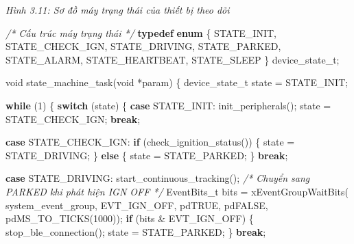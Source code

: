 \documentclass[13pt,a4paper]{extarticle}
\newenvironment{Shaded}{}{}
\newcommand{\CommentTok}[1]{\textcolor[rgb]{0.38,0.63,0.69}{\textit{#1}}}
\newcommand{\ControlFlowTok}[1]{\textcolor[rgb]{0.00,0.44,0.13}{\textbf{#1}}}
\newcommand{\DataTypeTok}[1]{\textcolor[rgb]{0.56,0.13,0.00}{#1}}
\newcommand{\DecValTok}[1]{\textcolor[rgb]{0.25,0.63,0.44}{#1}}
\newcommand{\KeywordTok}[1]{\textcolor[rgb]{0.00,0.44,0.13}{\textbf{#1}}}
\newcommand{\NormalTok}[1]{#1}
\newcommand{\OperatorTok}[1]{\textcolor[rgb]{0.40,0.40,0.40}{#1}}
\renewcommand{\\}{\thesislongtableorignewline\hline}%
\newcommand{\thesisfigurecaption}[1]{%
  \begin{center}\emph{#1}\end{center}%
}
\begin{document}
\thesisfigurecaption{Hình 3.11: Sơ đồ máy trạng thái của thiết bị theo dõi}

\begin{Shaded}
\begin{Highlighting}[]
\CommentTok{/* Cấu trúc máy trạng thái */}
\KeywordTok{typedef} \KeywordTok{enum} \OperatorTok{\{}
\NormalTok{    STATE\_INIT}\OperatorTok{,}
\NormalTok{    STATE\_CHECK\_IGN}\OperatorTok{,}
\NormalTok{    STATE\_DRIVING}\OperatorTok{,}
\NormalTok{    STATE\_PARKED}\OperatorTok{,}
\NormalTok{    STATE\_ALARM}\OperatorTok{,}
\NormalTok{    STATE\_HEARTBEAT}\OperatorTok{,}
\NormalTok{    STATE\_SLEEP}
\OperatorTok{\}}\NormalTok{ device\_state\_t}\OperatorTok{;}

\DataTypeTok{void}\NormalTok{ state\_machine\_task}\OperatorTok{(}\DataTypeTok{void} \OperatorTok{*}\NormalTok{param}\OperatorTok{)} \OperatorTok{\{}
\NormalTok{    device\_state\_t state }\OperatorTok{=}\NormalTok{ STATE\_INIT}\OperatorTok{;}

    \ControlFlowTok{while} \OperatorTok{(}\DecValTok{1}\OperatorTok{)} \OperatorTok{\{}
        \ControlFlowTok{switch} \OperatorTok{(}\NormalTok{state}\OperatorTok{)} \OperatorTok{\{}
        \ControlFlowTok{case}\NormalTok{ STATE\_INIT}\OperatorTok{:}
\NormalTok{            init\_peripherals}\OperatorTok{();}
\NormalTok{            state }\OperatorTok{=}\NormalTok{ STATE\_CHECK\_IGN}\OperatorTok{;}
            \ControlFlowTok{break}\OperatorTok{;}

        \ControlFlowTok{case}\NormalTok{ STATE\_CHECK\_IGN}\OperatorTok{:}
            \ControlFlowTok{if} \OperatorTok{(}\NormalTok{check\_ignition\_status}\OperatorTok{())} \OperatorTok{\{}
\NormalTok{                state }\OperatorTok{=}\NormalTok{ STATE\_DRIVING}\OperatorTok{;}
            \OperatorTok{\}} \ControlFlowTok{else} \OperatorTok{\{}
\NormalTok{                state }\OperatorTok{=}\NormalTok{ STATE\_PARKED}\OperatorTok{;}
            \OperatorTok{\}}
            \ControlFlowTok{break}\OperatorTok{;}

        \ControlFlowTok{case}\NormalTok{ STATE\_DRIVING}\OperatorTok{:}
\NormalTok{            start\_continuous\_tracking}\OperatorTok{();}
            \CommentTok{/* Chuyển sang PARKED khi phát hiện IGN OFF */}
\NormalTok{            EventBits\_t bits }\OperatorTok{=}\NormalTok{ xEventGroupWaitBits}\OperatorTok{(}
\NormalTok{                system\_event\_group}\OperatorTok{,}\NormalTok{ EVT\_IGN\_OFF}\OperatorTok{,}
\NormalTok{                pdTRUE}\OperatorTok{,}\NormalTok{ pdFALSE}\OperatorTok{,}\NormalTok{ pdMS\_TO\_TICKS}\OperatorTok{(}\DecValTok{1000}\OperatorTok{));}
            \ControlFlowTok{if} \OperatorTok{(}\NormalTok{bits }\OperatorTok{\&}\NormalTok{ EVT\_IGN\_OFF}\OperatorTok{)} \OperatorTok{\{}
\NormalTok{                stop\_ble\_connection}\OperatorTok{();}
\NormalTok{                state }\OperatorTok{=}\NormalTok{ STATE\_PARKED}\OperatorTok{;}
            \OperatorTok{\}}
            \ControlFlowTok{break}\OperatorTok{;}


\end{Highlighting}
\end{Shaded}
\end{document}
